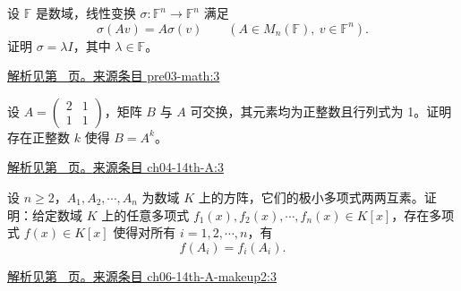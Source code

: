 \documentclass[UTF8,12pt,a4paper,fontset=fandol]{ctexart}
\begin{document}
\begin{example}\label{ex:pre03-math:3}

设 $\mathbb F$ 是数域，线性变换 $\sigma:\mathbb F^n\to\mathbb F^n$ 满足
\[
\sigma(Av)=A\sigma(v)
\qquad(A\in M_n(\mathbb F),\ v\in\mathbb F^n).
\]
证明 $\sigma=\lambda I$，其中 $\lambda\in\mathbb F$。

\par\hyperref[ans:pre03-math:3]{解析见第~\pageref{ans:pre03-math:3} 页。}\quad\href{https://github.com/lzxcr/cmc-mathematics/blob/64916fa1fdbc3e444a652eca204d5669058ee321/src/problems/preliminary/03/03.md}{来源条目 pre03-math:3}

\end{example}

\begin{example}\label{ex:ch04-14th-A:3}

设 $A=\begin{pmatrix}2&1\\1&1\end{pmatrix}$，矩阵 $B$ 与 $A$ 可交换，其元素均为正整数且行列式为 1。证明存在正整数 $k$ 使得 $B=A^{k}$。

\par\hyperref[ans:ch04-14th-A:3]{解析见第~\pageref{ans:ch04-14th-A:3} 页。}\quad\href{https://github.com/lzxcr/cmc-mathematics/blob/64916fa1fdbc3e444a652eca204d5669058ee321/src/problems/preliminary/14/03.md}{来源条目 ch04-14th-A:3}

\end{example}

\begin{example}\label{ex:ch06-14th-A-makeup2:3}

设 $n\geq 2$，$A_{1},A_{2},\cdots,A_{n}$ 为数域 $K$ 上的方阵，它们的极小多项式两两互素。证明：给定数域 $K$ 上的任意多项式 $f_{1}(x),f_{2}(x),\cdots,f_{n}(x)\in K[x]$，存在多项式 $f(x)\in K[x]$ 使得对所有 $i=1,2,\cdots,n$，有
\[
f\left(A_{i}\right)=f_{i}\left(A_{i}\right).
\]

\par\hyperref[ans:ch06-14th-A-makeup2:3]{解析见第~\pageref{ans:ch06-14th-A-makeup2:3} 页。}\quad\href{https://github.com/lzxcr/cmc-mathematics/blob/64916fa1fdbc3e444a652eca204d5669058ee321/src/problems/preliminary/14-makeup2/03.md}{来源条目 ch06-14th-A-makeup2:3}

\end{example}
\end{document}
